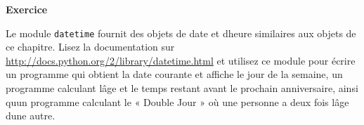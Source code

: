 \textbf{Exercice}

Le module \texttt{datetime} fournit des objets de date et
d\textquotesingle heure similaires aux objets de ce chapitre. Lisez la
documentation sur \url{http://docs.python.org/2/library/datetime.html}
et utilisez ce module pour écrire un programme qui obtient la date
courante et affiche le jour de la semaine, un programme calculant
l\textquotesingle âge et le temps restant avant le prochain
anniversaire, ainsi qu\textquotesingle un programme calculant le «
Double Jour » où une personne a deux fois l\textquotesingle âge
d\textquotesingle une autre.
